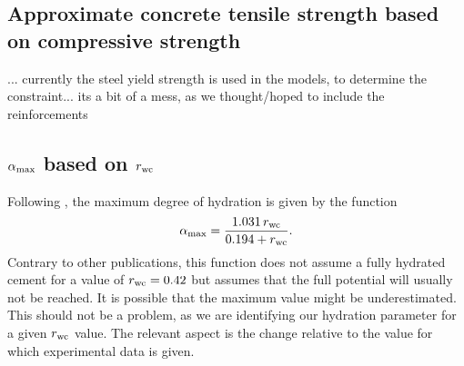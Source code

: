 \subsection{Approximate concrete tensile strength based on compressive strength}
... currently the steel yield strength is used in the models, to determine the constraint...
its a bit of a mess, as we thought/hoped to include the reinforcements

\subsection{\texorpdfstring{$\alpha_{\text{max}}$}{Maxiumum DoH} based on \texorpdfstring{$r_{\text{wc}}$}{w/c}}
Following \cite{Mills1966fico}, the maximum degree of hydration is given by the function
\begin{align}
	\alpha_{\text{max}} = \dfrac{1.031\,r_{\text{wc}}}{0.194 + r_{\text{wc}}}.
\end{align}
Contrary to other publications, this function does not assume a fully hydrated cement for a value of $r_{\text{wc}} = 0.42$ but assumes that the full potential will usually not be reached.
It is possible that the maximum value might be underestimated.
This should not be a problem, as we are identifying our hydration parameter for a given $r_{\text{wc}}$ value.
The relevant aspect is the change relative to the value for which experimental data is given.